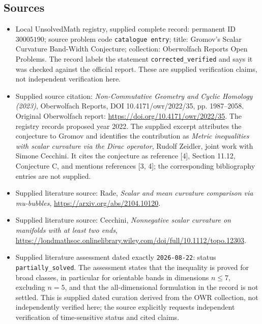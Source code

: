 \documentclass[11pt]{article}
\begin{document}
\subsection{Sources}
\begin{itemize}
\item Local UnsolvedMath registry, supplied complete record: permanent ID \(30005190\); source problem code \texttt{catalogue entry}; title: Gromov's Scalar Curvature Band-Width Conjecture; collection: Oberwolfach Reports Open Problems. The record labels the statement \texttt{corrected\_verified} and says it was checked against the official report. These are supplied verification claims, not independent verification here.
\item Supplied source citation: \emph{Non-Commutative Geometry and Cyclic Homology (2023)}, Oberwolfach Reports, DOI 10.4171/owr/2022/35, pp. 1987--2058. Original Oberwolfach report: \url{https://doi.org/10.4171/owr/2022/35}. The registry records proposed year 2022. The supplied excerpt attributes the conjecture to Gromov and identifies the contribution as \emph{Metric inequalities with scalar curvature via the Dirac operator}, Rudolf Zeidler, joint work with Simone Cecchini. It cites the conjecture as reference [4], Section 11.12, Conjecture C, and mentions references [3, 4]; the corresponding bibliography entries are not supplied.
\item Supplied literature source: Rade, \emph{Scalar and mean curvature comparison via mu-bubbles}, \url{https://arxiv.org/abs/2104.10120}.
\item Supplied literature source: Cecchini, \emph{Nonnegative scalar curvature on manifolds with at least two ends}, \url{https://londmathsoc.onlinelibrary.wiley.com/doi/full/10.1112/topo.12303}.
\item Supplied literature assessment dated exactly \texttt{2026-08-22}: status \texttt{partially\_solved}. The assessment states that the inequality is proved for broad classes, in particular for orientable bands in dimensions \(n\leq7\), excluding \(n=5\), and that the all-dimensional formulation in the record is not settled. This is supplied dated curation derived from the OWR collection, not independently verified here; the source explicitly requests independent verification of time-sensitive status and cited claims.
\end{itemize}
\end{document}
